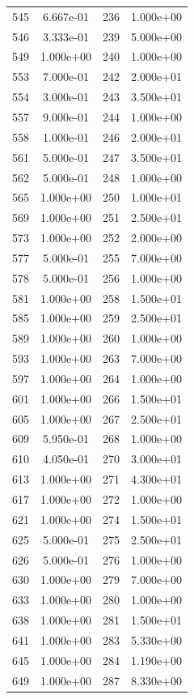 \documentclass[12pt]{article}
\begin{document}
\begin{longtable}{@{}cccc@{}}
545 & 6.667e-01 & 236 & 1.000e+00 \\
546 & 3.333e-01 & 239 & 5.000e+00 \\
549 & 1.000e+00 & 240 & 1.000e+00 \\
553 & 7.000e-01 & 242 & 2.000e+01 \\
554 & 3.000e-01 & 243 & 3.500e+01 \\
557 & 9.000e-01 & 244 & 1.000e+00 \\
558 & 1.000e-01 & 246 & 2.000e+01 \\
561 & 5.000e-01 & 247 & 3.500e+01 \\
562 & 5.000e-01 & 248 & 1.000e+00 \\
565 & 1.000e+00 & 250 & 1.000e+01 \\
569 & 1.000e+00 & 251 & 2.500e+01 \\
573 & 1.000e+00 & 252 & 2.000e+00 \\
577 & 5.000e-01 & 255 & 7.000e+00 \\
578 & 5.000e-01 & 256 & 1.000e+00 \\
581 & 1.000e+00 & 258 & 1.500e+01 \\
585 & 1.000e+00 & 259 & 2.500e+01 \\
589 & 1.000e+00 & 260 & 1.000e+00 \\
593 & 1.000e+00 & 263 & 7.000e+00 \\
597 & 1.000e+00 & 264 & 1.000e+00 \\
601 & 1.000e+00 & 266 & 1.500e+01 \\
605 & 1.000e+00 & 267 & 2.500e+01 \\
609 & 5.950e-01 & 268 & 1.000e+00 \\
610 & 4.050e-01 & 270 & 3.000e+01 \\
613 & 1.000e+00 & 271 & 4.300e+01 \\
617 & 1.000e+00 & 272 & 1.000e+00 \\
621 & 1.000e+00 & 274 & 1.500e+01 \\
625 & 5.000e-01 & 275 & 2.500e+01 \\
626 & 5.000e-01 & 276 & 1.000e+00 \\
630 & 1.000e+00 & 279 & 7.000e+00 \\
633 & 1.000e+00 & 280 & 1.000e+00 \\
638 & 1.000e+00 & 281 & 1.500e+01 \\
641 & 1.000e+00 & 283 & 5.330e+00 \\
645 & 1.000e+00 & 284 & 1.190e+00 \\
649 & 1.000e+00 & 287 & 8.330e+00 \\

\end{longtable}
\end{document}
